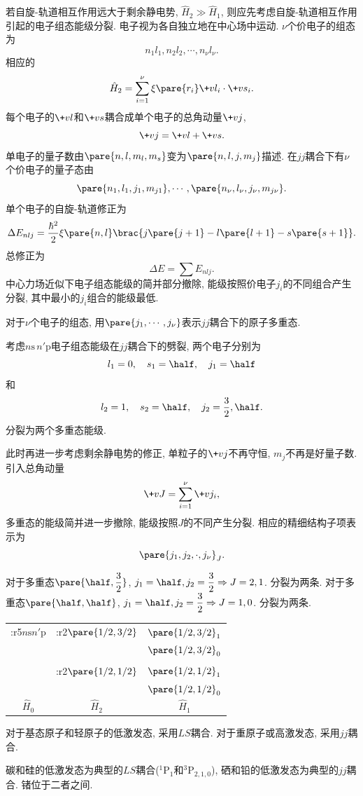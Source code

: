 \documentclass[hidelinks]{ctexart}
\begin{document}
若自旋-轨道相互作用远大于剩余静电势, $\hat H_2 \gg \hat H_1$, 则应先考虑自旋-轨道相互作用引起的电子组态能级分裂. 电子视为各自独立地在中心场中运动. $\nu$个价电子的组态为
\[ n_1l_1,n_2l_2,\cdots,n_\nu l_\nu. \]
相应的
\[ \hat H_2 = \sum_{i=1}^\nu \xi\pare{r_i} \+vl_i\cdot \+vs_i. \]
每个电子的$\+vl$和$\+vs$耦合成单个电子的总角动量$\+vj$,
\[ \+vj = \+vl + \+vs. \]
单电子的量子数由$\pare{n,l,m_l,m_s}$变为$\pare{n,l,j,m_j}$描述. 在$jj$耦合下有$\nu$个价电子的量子态由
\[ \pare{n_1,l_1,j_1,m_{j1}},\cdots,\pare{n_\nu,l_\nu,j_\nu,m_{j\nu}}. \]
单个电子的自旋-轨道修正为
\[ \Delta E_{nlj} = \frac{\hbar^2}{2}\xi\pare{n,l}\brac{j\pare{j+1} - l\pare{l+1} - s\pare{s+1}}. \]
总修正为
\[ \Delta E = \sum E_{nlj}. \]
中心力场近似下电子组态能级的简并部分撤除, 能级按照价电子$j_i$的不同组合产生分裂, 其中最小的$j_i$组合的能级最低.
\par
对于$\nu$个电子的组态, 用$\pare{j_1,\cdots,j_\nu}$表示$jj$耦合下的原子多重态.
\begin{ex}
    考虑$n\mathrm{s}\,n'\mathrm{p}$电子组态能级在$jj$耦合下的劈裂, 两个电子分别为
    \[ l_1 = 0,\quad s_1=\half,\quad j_1=\half \]
    和
    \[ l_2 = 1,\quad s_2=\half,\quad j_2=\frac{3}{2},\half. \]
    分裂为两个多重态能级.
\end{ex}
此时再进一步考虑剩余静电势的修正, 单粒子的$\+vj$不再守恒, $m_j$不再是好量子数. 引入总角动量
\[ \+vJ = \sum_{i=1}^\nu \+vj_i, \]
多重态的能级简并进一步撤除, 能级按照$J$的不同产生分裂. 相应的精细结构子项表示为
\[ \pare{j_1,j_2,\cdot,j_\nu}_J. \]
\begin{ex}
    对于多重态$\displaystyle \pare{\half,\frac{3}{2}}$, $\displaystyle j_1 = \half, j_2 = \frac{3}{2} \Rightarrow J = 2,1$. 分裂为两条. 对于多重态$\displaystyle \pare{\half,\half}$, $\displaystyle j_1 = \half, j_2 = \frac{3}{2} \Rightarrow J = 1,0$. 分裂为两条.
    \begin{center}
        \begin{tabular}{ccc}
            \+:r5{$n\mathrm{s}n'\mathrm{p}$} & \+:r2{$\pare{1/2,3/2}$} & $\pare{1/2,3/2}_1$ \\
             &  & $\pare{1/2,3/2}_0$ \\
             \\
            & \+:r2{$\pare{1/2,1/2}$} & $\pare{1/2,1/2}_1$ \\
             &  & $\pare{1/2,1/2}_0$ \\
            $\hat H_0$ & $\hat H_2$ & $\hat H_1$
        \end{tabular}
    \end{center}
\end{ex}
\begin{remark}
    对于基态原子和轻原子的低激发态, 采用$LS$耦合. 对于重原子或高激发态, 采用$jj$耦合.
\end{remark}
\begin{ex}
    碳和硅的低激发态为典型的$LS$耦合($^1\mathrm{P}_1$和$^3\mathrm{P}_{2,1,0}$), 硒和铅的低激发态为典型的$jj$耦合. 锗位于二者之间.
\end{ex}
\end{document}
